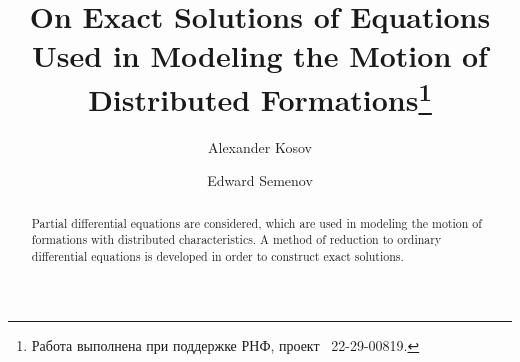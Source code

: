 \begin{englishtitle} %
\title{On Exact Solutions of Equations Used in Modeling the Motion of Distributed Formations\thanks{Работа выполнена при поддержке РНФ, проект \textnumero~22-29-00819.}}
\author{Alexander Kosov 
  \and
  Edward Semenov 
}

\maketitle

\begin{abstract}
Partial differential equations are considered, which are used in modeling the motion of formations with distributed characteristics. A method of reduction to ordinary differential equations is developed in order to construct exact solutions.

\end{abstract}
\end{englishtitle}


\iffalse
\documentclass[12pt]{llncs}  %

\usepackage[T2A]{fontenc}
\usepackage[cp1251]{inputenc} %
\usepackage[english,russian]{babel}




